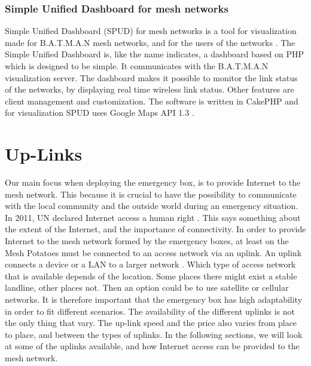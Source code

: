 \subsubsection{Simple Unified Dashboard for mesh networks}
Simple Unified Dashboard (SPUD) for mesh networks is a tool for visualization made for B.A.T.M.A.N mesh networks, and for the users of the networks \cite{spud}. The Simple Unified Dashboard is, like the name indicates, a dashboard based on PHP which is designed to be simple. It communicates with the B.A.T.M.A.N visualization server. The dashboard makes it possible to monitor the link status of the networks, by displaying real time wireless link status. Other features are client management and customization. The software is written in CakePHP and for visualization SPUD uses Google Maps API 1.3 \cite{spud}.

\section{Up-Links}
Our main focus when deploying the emergency box, is to provide Internet to the mesh network. This because it is crucial to have the possibility to communicate with the local community and the outside world during an emergency situation. In 2011, UN declared Internet access a human right \cite{HR}. This says something about the extent of the Internet, and the importance of connectivity. In order to provide Internet to the mesh network formed by the emergency boxes, at least on the Mesh Potatoes must be connected to an access network via an uplink. An uplink connects a device or a LAN to a larger network \cite{uplink}. Which type of access network that is available depends of the location. Some places there might exist a stable landline, other places not. Then an option could be to use satellite or cellular networks. It is therefore important that the emergency box has high adaptability in order to fit different scenarios. The availability of the different uplinks is not the only thing that vary. The up-link speed and the price also varies from place to place, and between the types of uplinks. In the following sections, we will look at some of the uplinks available, and how Internet access can be provided to the mesh network.  


